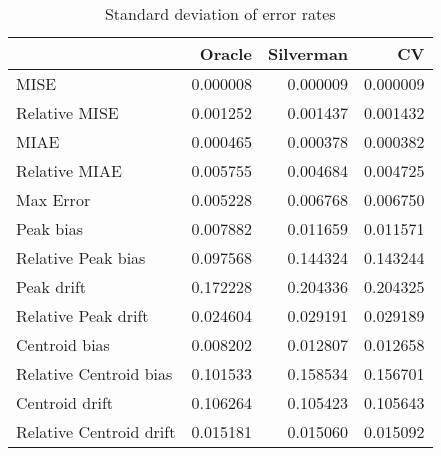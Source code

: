 \begin{table}[H]
\centering
\begin{tabular}{lrrr}
  \hline
 & Oracle & Silverman & CV \\ 
  \hline
MISE & 0.000008 & 0.000009 & 0.000009 \\ 
  Relative MISE & 0.001252 & 0.001437 & 0.001432 \\ 
  MIAE & 0.000465 & 0.000378 & 0.000382 \\ 
  Relative MIAE & 0.005755 & 0.004684 & 0.004725 \\ 
  Max Error & 0.005228 & 0.006768 & 0.006750 \\ 
  Peak bias & 0.007882 & 0.011659 & 0.011571 \\ 
  Relative Peak bias & 0.097568 & 0.144324 & 0.143244 \\ 
  Peak drift & 0.172228 & 0.204336 & 0.204325 \\ 
  Relative Peak drift & 0.024604 & 0.029191 & 0.029189 \\ 
  Centroid bias & 0.008202 & 0.012807 & 0.012658 \\ 
  Relative Centroid bias & 0.101533 & 0.158534 & 0.156701 \\ 
  Centroid drift & 0.106264 & 0.105423 & 0.105643 \\ 
  Relative Centroid drift & 0.015181 & 0.015060 & 0.015092 \\ 
   \hline
\end{tabular}
\caption{Standard deviation of error rates} 
\label{tbl:stddev_error_rates}
\end{table}
